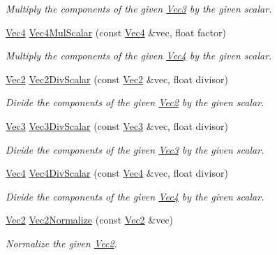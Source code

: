 \begin{DoxyCompactItemize}
\begin{DoxyCompactList}\small\item\em Multiply the components of the given \hyperlink{classgfxmath_1_1_vec3}{Vec3} by the given scalar. \end{DoxyCompactList}\item 
\hyperlink{classgfxmath_1_1_vec4}{Vec4} \hyperlink{group___s_i_s_d_vec_math_ga70441f2888f0df752fe0624a5a7b362d}{Vec4\+Mul\+Scalar} (const \hyperlink{classgfxmath_1_1_vec4}{Vec4} \&vec, float factor)
\begin{DoxyCompactList}\small\item\em Multiply the components of the given \hyperlink{classgfxmath_1_1_vec4}{Vec4} by the given scalar. \end{DoxyCompactList}\item 
\hyperlink{classgfxmath_1_1_vec2}{Vec2} \hyperlink{group___s_i_s_d_vec_math_ga8686be4c3f0ee27b05363661fb75a228}{Vec2\+Div\+Scalar} (const \hyperlink{classgfxmath_1_1_vec2}{Vec2} \&vec, float divisor)
\begin{DoxyCompactList}\small\item\em Divide the components of the given \hyperlink{classgfxmath_1_1_vec2}{Vec2} by the given scalar. \end{DoxyCompactList}\item 
\hyperlink{classgfxmath_1_1_vec3}{Vec3} \hyperlink{group___s_i_s_d_vec_math_ga8c2d0c0b9d70b417e598489374ef1f88}{Vec3\+Div\+Scalar} (const \hyperlink{classgfxmath_1_1_vec3}{Vec3} \&vec, float divisor)
\begin{DoxyCompactList}\small\item\em Divide the components of the given \hyperlink{classgfxmath_1_1_vec3}{Vec3} by the given scalar. \end{DoxyCompactList}\item 
\hyperlink{classgfxmath_1_1_vec4}{Vec4} \hyperlink{group___s_i_s_d_vec_math_ga670f1f6ebdadeaa2f656f153218fdee8}{Vec4\+Div\+Scalar} (const \hyperlink{classgfxmath_1_1_vec4}{Vec4} \&vec, float divisor)
\begin{DoxyCompactList}\small\item\em Divide the components of the given \hyperlink{classgfxmath_1_1_vec4}{Vec4} by the given scalar. \end{DoxyCompactList}\item 
\hyperlink{classgfxmath_1_1_vec2}{Vec2} \hyperlink{group___s_i_s_d_vec_math_gaa0125e18e221531bfc7d72d47cdf42d9}{Vec2\+Normalize} (const \hyperlink{classgfxmath_1_1_vec2}{Vec2} \&vec)
\begin{DoxyCompactList}\small\item\em Normalize the given \hyperlink{classgfxmath_1_1_vec2}{Vec2}. \end{DoxyCompactList}\item 

\end{DoxyCompactItemize}

